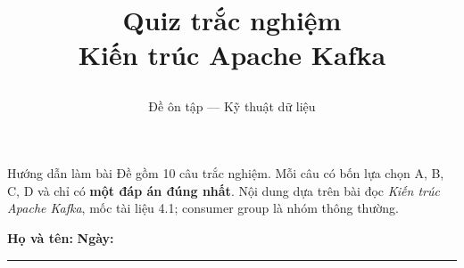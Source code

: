 
\title{\parbox[c][\TitleBlockHeight][c]{0.90\textwidth}{\centering\fontsize{20pt}{24pt}\selectfont\bfseries Quiz trắc nghiệm\\Kiến trúc Apache Kafka}}
\author{Đề ôn tập --- Kỹ thuật dữ liệu}

\maketitle
\thispagestyle{firstpage}
\vspace{-1em}
\begin{infobox}{Hướng dẫn làm bài}
Đề gồm 10 câu trắc nghiệm. Mỗi câu có bốn lựa chọn A, B, C, D và chỉ có \textbf{một đáp án đúng nhất}. Nội dung dựa trên bài đọc \emph{Kiến trúc Apache Kafka}, mốc tài liệu 4.1; consumer group là nhóm thông thường.
\end{infobox}
\noindent\textbf{Họ và tên:} \dotfill\quad\textbf{Ngày:} \rule{2.5cm}{0.3pt}
\par\medskip


